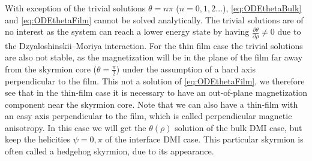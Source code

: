 \documentclass[12pt, a4paper, twoside, openright]{article}		%
\numberwithin{equation}{section}
\begin{document}
With exception of the trivial solutions $\theta = n\pi$ ($n = 0, 1, 2 \ldots$), \eqref{eq:ODEthetaBulk} and \eqref{eq:ODEthetaFilm} cannot be solved analytically. The trivial solutions are of no interest as the system can reach a lower energy state by having $\frac{\partial\theta}{\partial\rho}\neq 0$ due to the Dzyaloshinskii--Moriya interaction. For the thin film case the trivial solutions are also not stable, as the magnetization will be in the plane of the film far away from the skyrmion core ($\theta=\frac{\pi}{2}$) under the assumption of a hard axis perpendicular to the film. This not a solution of \eqref{eq:ODEthetaFilm}, we therefore see that in the thin-film case it is necessary to have an out-of-plane magnetization component near the skyrmion core. Note that we can also have a thin-film with an easy axis perpendicular to the film, which is called perpendicular magnetic anisotropy. In this case we will get the $\theta(\rho)$ solution of the bulk DMI case, but keep the helicities $\psi = 0, \pi$ of the interface DMI case. This particular skyrmion is often called a hedgehog skyrmion, due to its appearance.
\end{document}

